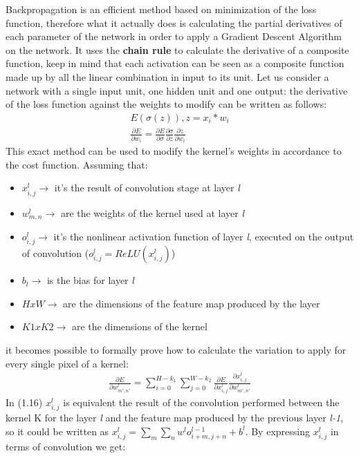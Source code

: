 \documentclass[11pt,a4paper,titlepage]{book}
\begin{document}
Backpropagation is an efficient method based on minimization of the loss function, therefore what it actually does is calculating the partial derivatives of each parameter of the network in order to apply a Gradient Descent Algorithm on the network.
\newline
It uses the \textbf{chain rule} to calculate the derivative of a composite function, keep in mind that each activation can be seen as a composite function made up by all the linear combination in input to its unit. 
\newline
\newline
Let us consider a network with a single input unit, one hidden unit and one output: the derivative of the loss function against the weights to modify can be written as follows:
\begin{align}
    E(\sigma(z)), z = x_i * w_i \\
    \frac{\partial E}{\partial w_i} = \frac{\partial E}{\partial \sigma} \frac{\partial \sigma}{\partial z} \frac{\partial z}{\partial w_i}
\end{align}
This exact method can be used to modify the kernel's weights in accordance to the cost function. Assuming that:
\begin{itemize}
    \item $x_{i,j}^l \longrightarrow$ it's the result of convolution stage at layer \textit{l}
    \item $w_{m,n}^l \longrightarrow$ are the weights of the kernel used at layer \textit{l}
    \item $o_{i,j}^l \longrightarrow$ it's the nonlinear activation function of layer \textit{l}, executed on the output of convolution ($o_{i,j}^l = ReLU(x_{i,j}^l)$)
    \item $b_l \longrightarrow$ is the bias for layer \textit{l}
    \item $H x W \longrightarrow$ are the dimensions of the feature map produced by the layer
    \item $K1 x K2 \longrightarrow$ are the dimensions of the kernel
\end{itemize}
it becomes possible to formally prove how to calculate the variation to apply for every single pixel of a kernel:
\begin{align}
    \frac{\partial E}{\partial w_{m',n'}^l} = \sum_{i=0}^{H-k_1} \sum_{j=0}^{W-k_2} \frac{\partial E}{\partial x_{i,j}^l} \frac{\partial x_{i,j}^l}{\partial w_{m',n'}^l}
\end{align}
In (1.16) $x_{i,j}^l$ is equivalent the result of the convolution performed between the kernel K for the layer \textit{l} and the feature map produced by the previous layer \textit{l-1}, so it could be written as $x_{i,j}^l = \sum_{m}\sum_{n} w_{}^l o_{i+m,j+n}^{l-1} + b^l$. By expressing $x_{i,j}^l$ in terms of convolution we get:
\end{document}

